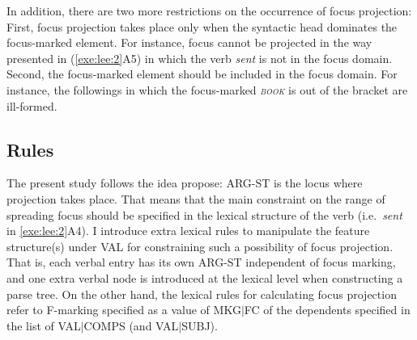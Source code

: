 
\noindent In addition, there are two more restrictions on the
occurrence of focus projection: First, focus projection takes place
only when the syntactic head dominates the focus-marked element.  For
instance, focus cannot be projected in the way presented in
(\ref{exe:lee:2}A5) in which the verb \textit{sent} is not in the
focus domain.  Second, the focus-marked element should be included in
the focus domain. For instance, the followings in which the
focus-marked \textit{\textsc{book}} is out of the bracket are
ill-formed.

 
\subsection{Rules}
\label{10-4:ssec:Rules}


The present study follows the idea \citet{chung:etal:03} propose:
ARG-ST is the locus where  projection takes place. That means that the main constraint on the range of
spreading focus should be specified in the lexical structure of the
verb (i.e.\ \textit{sent} in \ref{exe:lee:2}A4). I introduce extra
lexical rules to manipulate the feature structure(s) under VAL for
constraining such a possibility of focus projection. That is, each
verbal entry has its own ARG-ST independent of focus marking, and one
extra verbal node is introduced at the lexical level when constructing
a parse tree. On the other hand, the lexical rules for calculating
focus projection refer to F-marking specified as a value of
MKG{$\mid$}FC of the dependents specified in the list of
VAL{$\mid$}COMPS (and VAL{$\mid$}SUBJ).



